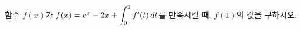 \hspace*{2mm}\begin{minipage}[t]{\dimexpr\linewidth-2mm\relax}\vspace{0pt}
함수 $f(x)$가 $f(x)=e^x-2x+\displaystyle\int_{0}^{1}f'(t)\mkern3mu dt$를 만족시킬 때, $f(1)$의 값을 구하시오.\end{minipage}
